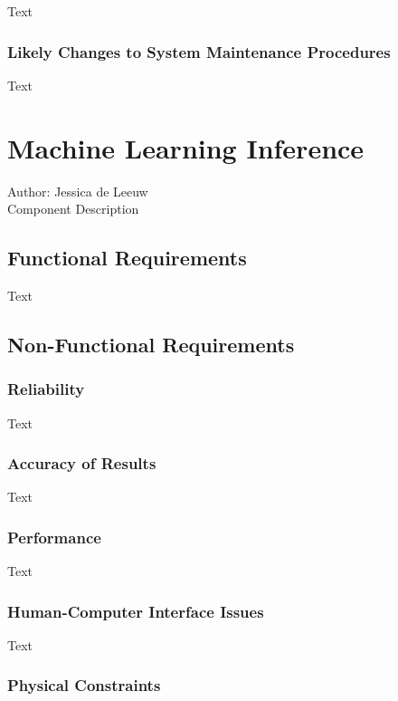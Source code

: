 \documentclass[12pt]{article}
\begin{document}
Text

\subsubsection {Likely Changes to System Maintenance Procedures}

Text

\section{Machine Learning Inference}
Author: Jessica de Leeuw\\

\noindent Component Description

\subsection{Functional Requirements}

Text

\subsection{Non-Functional Requirements}

\subsubsection {Reliability}

Text

\subsubsection {Accuracy of Results}
 
Text

\subsubsection {Performance}

Text

\subsubsection {Human-Computer Interface Issues}

Text

\subsubsection {Physical Constraints}
\end{document}
